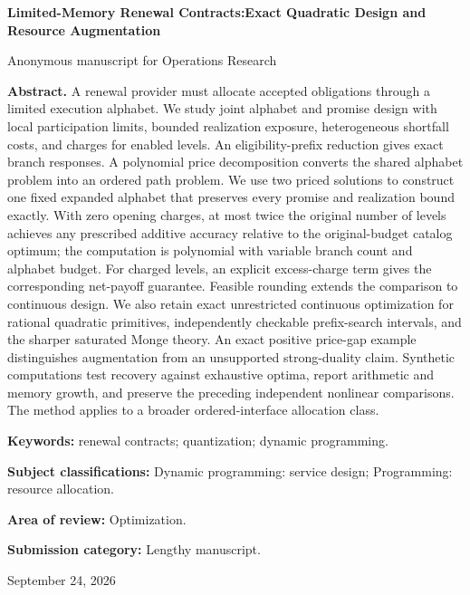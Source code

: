 \documentclass[11pt,letterpaper]{article}
\theoremstyle{definition}\newtheorem{assumption}[theorem]{Assumption}
\begin{document}
\hypersetup{pageanchor=false}
\begin{titlepage}\centering
{\Large\bfseries Limited-Memory Renewal Contracts:\newline Exact Quadratic Design and Resource Augmentation\par}
\vspace{.3in}Anonymous manuscript for Operations Research\par\vspace{.2in}
\begin{minipage}{\textwidth}\textbf{Abstract.} A renewal provider must allocate accepted obligations through a limited execution alphabet. We study joint alphabet and promise design with local participation limits, bounded realization exposure, heterogeneous shortfall costs, and charges for enabled levels. An eligibility-prefix reduction gives exact branch responses. A polynomial price decomposition converts the shared alphabet problem into an ordered path problem. We use two priced solutions to construct one fixed expanded alphabet that preserves every promise and realization bound exactly. With zero opening charges, at most twice the original number of levels achieves any prescribed additive accuracy relative to the original-budget catalog optimum; the computation is polynomial with variable branch count and alphabet budget. For charged levels, an explicit excess-charge term gives the corresponding net-payoff guarantee. Feasible rounding extends the comparison to continuous design. We also retain exact unrestricted continuous optimization for rational quadratic primitives, independently checkable prefix-search intervals, and the sharper saturated Monge theory. An exact positive price-gap example distinguishes augmentation from an unsupported strong-duality claim. Synthetic computations test recovery against exhaustive optima, report arithmetic and memory growth, and preserve the preceding independent nonlinear comparisons. The method applies to a broader ordered-interface allocation class.
\par\vspace{.15in}\textbf{Keywords:} renewal contracts; quantization; dynamic programming.
\par\vspace{.1in}\textbf{Subject classifications:} Dynamic programming: service design; Programming: resource allocation.
\par\vspace{.1in}\textbf{Area of review:} Optimization.
\par\vspace{.1in}\textbf{Submission category:} Lengthy manuscript.
\end{minipage}\vfill September 24, 2026\end{titlepage}
\end{document}
